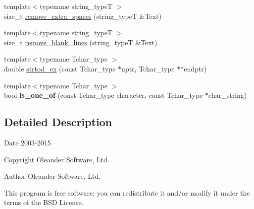 \begin{DoxyCompactItemize}
\item 
{\footnotesize template$<$typename string\-\_\-type\-T $>$ }\\size\-\_\-t \hyperlink{namespacestring__util_ac2e32e326c342905e91ab0025292f039}{remove\-\_\-extra\-\_\-spaces} (string\-\_\-type\-T \&Text)
\item 
{\footnotesize template$<$typename string\-\_\-type\-T $>$ }\\size\-\_\-t \hyperlink{namespacestring__util_a25307ecbc1d55724e503c7da9a5720ae}{remove\-\_\-blank\-\_\-lines} (string\-\_\-type\-T \&Text)
\item 
{\footnotesize template$<$typename Tchar\-\_\-type $>$ }\\double \hyperlink{namespacestring__util_ad14cb6f2828d7c49aee300734c38239c}{strtod\-\_\-ex} (const Tchar\-\_\-type $\ast$nptr, Tchar\-\_\-type $\ast$$\ast$endptr)
\item 
\hypertarget{namespacestring__util_a2c2a992607751ea675fb9e45c348a71d}{{\footnotesize template$<$typename Tchar\-\_\-type $>$ }\\bool {\bfseries is\-\_\-one\-\_\-of} (const Tchar\-\_\-type character, const Tchar\-\_\-type $\ast$char\-\_\-string)}\label{namespacestring__util_a2c2a992607751ea675fb9e45c348a71d}

\end{DoxyCompactItemize}


\subsection{Detailed Description}
\begin{DoxyDate}{Date}
2003-\/2015 
\end{DoxyDate}
\begin{DoxyCopyright}{Copyright}
Oleander Software, Ltd. 
\end{DoxyCopyright}
\begin{DoxyAuthor}{Author}
Oleander Software, Ltd.
\end{DoxyAuthor}
This program is free software; you can redistribute it and/or modify it under the terms of the B\-S\-D License. 

